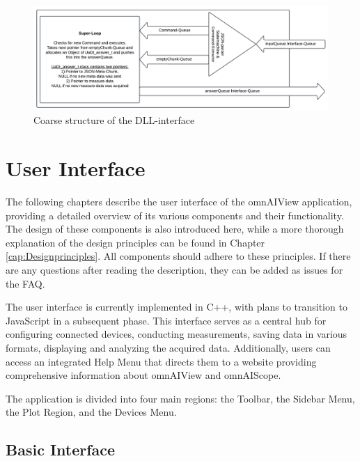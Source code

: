 \documentclass[]{scrreprt}
\begin{document}
\begin{figure}
    \includegraphics[width=.9\textwidth]{./assets/pictures/interface.pdf}
    \caption[]{Coarse structure of the DLL-interface}
    \label{fig:dllinterface}
\end{figure}





\section{User Interface}

The following chapters describe the user interface of the omnAIView application, providing a detailed overview of its various components and their functionality. The design of these components is also introduced here, while a more thorough explanation of the design principles can be found in Chapter \ref{cap:Designprinciples}. All components should adhere to these principles. If there are any questions after reading the description, they can be added as issues for the FAQ.

The user interface is currently implemented in C++, with plans to transition to JavaScript in a subsequent phase. This interface serves as a central hub for configuring connected devices, conducting measurements, saving data in various formats, displaying and analyzing the acquired data. Additionally, users can access an integrated Help Menu that directs them to a website providing comprehensive information about omnAIView and omnAIScope.

The application is divided into four main regions: the Toolbar, the Sidebar Menu, the Plot Region, and the Devices Menu.

\subsection{Basic Interface}
\end{document}
